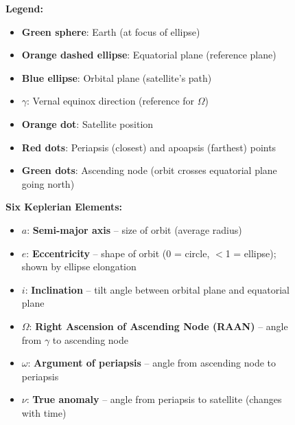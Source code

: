 \documentclass[11pt,a4paper]{article}
\begin{document}
\begin{figure}[htbp]

\vspace{0.3cm}

\begin{tcolorbox}[colback=blue!5!white,colframe=codeborder,width=0.95\textwidth,arc=2mm]
\small
\textbf{Legend:}
\begin{itemize}[leftmargin=*, nosep]
    \item \textcolor{earthcolor}{\textbf{Green sphere}}: Earth (at focus of ellipse)
    \item \textcolor{equatorcolor}{\textbf{Orange dashed ellipse}}: Equatorial plane (reference plane)
    \item \textcolor{orbitcolor}{\textbf{Blue ellipse}}: Orbital plane (satellite's path)
    \item \textcolor{refcolor}{$\gamma$}: Vernal equinox direction (reference for $\Omega$)
    \item \textcolor{orange!80!black}{\textbf{Orange dot}}: Satellite position
    \item \textcolor{red!70!black}{\textbf{Red dots}}: Periapsis (closest) and apoapsis (farthest) points
    \item \textcolor{green!50!black}{\textbf{Green dots}}: Ascending node (orbit crosses equatorial plane going north)
\end{itemize}

\textbf{Six Keplerian Elements:}
\begin{itemize}[leftmargin=*, nosep]
    \item \textcolor{blue!80!black}{$a$}: \textbf{Semi-major axis} -- size of orbit (average radius)
    \item $e$: \textbf{Eccentricity} -- shape of orbit (0 = circle, $<$1 = ellipse); shown by ellipse elongation
    \item \textcolor{red!80!black}{$i$}: \textbf{Inclination} -- tilt angle between orbital plane and equatorial plane
    \item \textcolor{green!50!black}{$\Omega$}: \textbf{Right Ascension of Ascending Node (RAAN)} -- angle from $\gamma$ to ascending node
    \item \textcolor{brown!80!black}{$\omega$}: \textbf{Argument of periapsis} -- angle from ascending node to periapsis
    \item \textcolor{violet!80!black}{$\nu$}: \textbf{True anomaly} -- angle from periapsis to satellite (changes with time)
\end{itemize}
\end{tcolorbox}


\end{figure}
\end{document}
